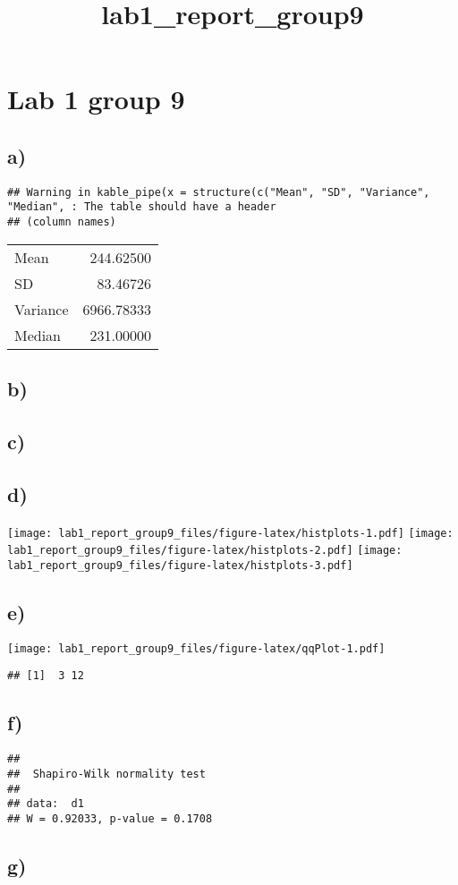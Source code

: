 \documentclass[
]{article}
\title{lab1\_report\_group9}
\author{}
\date{\vspace{-2.5em}}
\begin{document}
\maketitle

\hypertarget{lab-1-group-9}{%
\section{Lab 1 group 9}\label{lab-1-group-9}}

\hypertarget{a}{%
\subsection{a)}\label{a}}

\begin{verbatim}
## Warning in kable_pipe(x = structure(c("Mean", "SD", "Variance", "Median", : The table should have a header
## (column names)
\end{verbatim}

\begin{longtable}[]{@{}lr@{}}
\toprule
\endhead
Mean & 244.62500\tabularnewline
SD & 83.46726\tabularnewline
Variance & 6966.78333\tabularnewline
Median & 231.00000\tabularnewline
\bottomrule
\end{longtable}

\hypertarget{b}{%
\subsection{b)}\label{b}}

\hypertarget{c}{%
\subsection{c)}\label{c}}

\hypertarget{d}{%
\subsection{d)}\label{d}}

\texttt{[image: lab1\_report\_group9\_files/figure-latex/histplots-1.pdf]}
\texttt{[image: lab1\_report\_group9\_files/figure-latex/histplots-2.pdf]}
\texttt{[image: lab1\_report\_group9\_files/figure-latex/histplots-3.pdf]}

\hypertarget{e}{%
\subsection{e)}\label{e}}

\texttt{[image: lab1\_report\_group9\_files/figure-latex/qqPlot-1.pdf]}

\begin{verbatim}
## [1]  3 12
\end{verbatim}

\hypertarget{f}{%
\subsection{f)}\label{f}}

\begin{verbatim}
## 
##  Shapiro-Wilk normality test
## 
## data:  d1
## W = 0.92033, p-value = 0.1708
\end{verbatim}

\hypertarget{g}{%
\subsection{g)}\label{g}}
\end{document}
